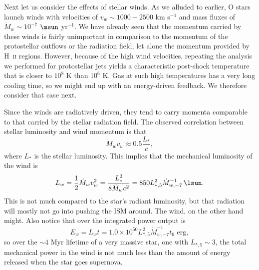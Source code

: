 Next let us consider the effects of stellar winds. As we alluded to earlier, O stars launch winds with velocities of $v_w \sim 1000-2500$ km s$^{-1}$ and mass fluxes of $\dot{M}_w \sim 10^{-7}$ $\msun$ yr$^{-1}$. We have already seen that the momentum carried by these winds is fairly unimportant in comparison to the momentum of the protostellar outflows or the radiation field, let alone the momentum provided by H~\textsc{ii} regions. However, because of the high wind velocities, repeating the analysis we performed for protostellar jets yields a characteristic post-shock temperature that is closer to $10^8$ K than $10^6$ K. Gas at such high temperatures has a very long cooling time, so we might end up with an energy-driven feedback. We therefore consider that case next.

Since the winds are radiatively driven, they tend to carry momenta comparable to that carried by the stellar radiation field. The observed correlation between stellar luminosity and wind momentum \citep[e.g.,][]{repolust04a} is that
\begin{equation}
\dot{M}_w v_w \approx 0.5 \frac{L_*}{c},
\end{equation}
where $L_*$ is the stellar luminosity. This implies that the mechanical luminosity of the wind is
\begin{equation}
L_w = \frac{1}{2} \dot{M}_w v_w^2 = \frac{L_*^2}{8 \dot{M}_w c^2} = 850 L_{*,5}^2 \dot{M}_{w,-7}^{-1} \, \lsun.
\end{equation}
This is not much compared to the star's radiant luminosity, but that radiation will mostly not go into pushing the ISM around. The wind, on the other hand might. Also notice that over the integrated power output is
\begin{equation}
E_w = L_w t = 1.0\times 10^{50}  L_{*,5}^2 \dot{M}_{w,-7}^{-1} t_6\mbox{ erg},
\end{equation}
so over the $\sim 4$ Myr lifetime of a very massive star, one with $L_{*,5}\sim 3$, the total mechanical power in the wind is not much less than the amount of energy released when the star goes supernova.

